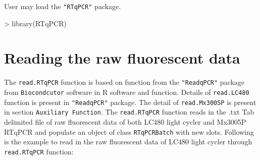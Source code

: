 \documentclass[11pt]{article}
\newcommand{\code}[1]{{\tt #1}}
\newcommand{\pkg}[1]{{\tt "#1"}}
\begin{document}
User may load the \pkg{RTqPCR} package.
\begin{Schunk}
\begin{Sinput}
> library(RTqPCR)
\end{Sinput}
\end{Schunk}

\section{Reading the raw fluorescent data} 
The \code{read.RTqPCR} function is based on \code{} function from the 
\pkg{ReadqPCR} package from \code{Biocondcutor} software in R software and \code{}
function. Details of \code{read.LC480} function is present in \pkg{ReadqPCR} package. The detail of
\code{read.Mx3005P} is present in section \code{Auxiliary Function}. The \code{read.RTqPCR} 
function reads in the .txt Tab delimited file of raw fluorescent data of both LC480 light cycler
and Mx3005P RTqPCR and populate an object of class \code{RTqPCRBatch} with new slots. Following 
is the example to read in the raw fluorescent data of LC480 light cycler through \code{read.RTqPCR} 
function:
\end{document}
